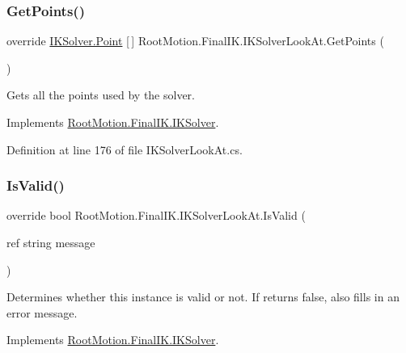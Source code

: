 \subsubsection{\texorpdfstring{Get\+Points()}{GetPoints()}}
{\footnotesize\ttfamily override \mbox{\hyperlink{class_root_motion_1_1_final_i_k_1_1_i_k_solver_1_1_point}{I\+K\+Solver.\+Point}} \mbox{[}$\,$\mbox{]} Root\+Motion.\+Final\+I\+K.\+I\+K\+Solver\+Look\+At.\+Get\+Points (\begin{DoxyParamCaption}{ }\end{DoxyParamCaption})\hspace{0.3cm}{\ttfamily [virtual]}}



Gets all the points used by the solver. 



Implements \mbox{\hyperlink{class_root_motion_1_1_final_i_k_1_1_i_k_solver_a29b0746bebf6bd6645cdeb6617030bff}{Root\+Motion.\+Final\+I\+K.\+I\+K\+Solver}}.



Definition at line 176 of file I\+K\+Solver\+Look\+At.\+cs.

\mbox{\label{class_root_motion_1_1_final_i_k_1_1_i_k_solver_look_at_ae5ed12132b2966c70cd02055844fe20d}} 
\subsubsection{\texorpdfstring{Is\+Valid()}{IsValid()}}
{\footnotesize\ttfamily override bool Root\+Motion.\+Final\+I\+K.\+I\+K\+Solver\+Look\+At.\+Is\+Valid (\begin{DoxyParamCaption}\item[{ref string}]{message }\end{DoxyParamCaption})\hspace{0.3cm}{\ttfamily [virtual]}}



Determines whether this instance is valid or not. If returns false, also fills in an error message. 



Implements \mbox{\hyperlink{class_root_motion_1_1_final_i_k_1_1_i_k_solver_a6ccc7496e7f4e95668e1c1bdaa051d67}{Root\+Motion.\+Final\+I\+K.\+I\+K\+Solver}}.



